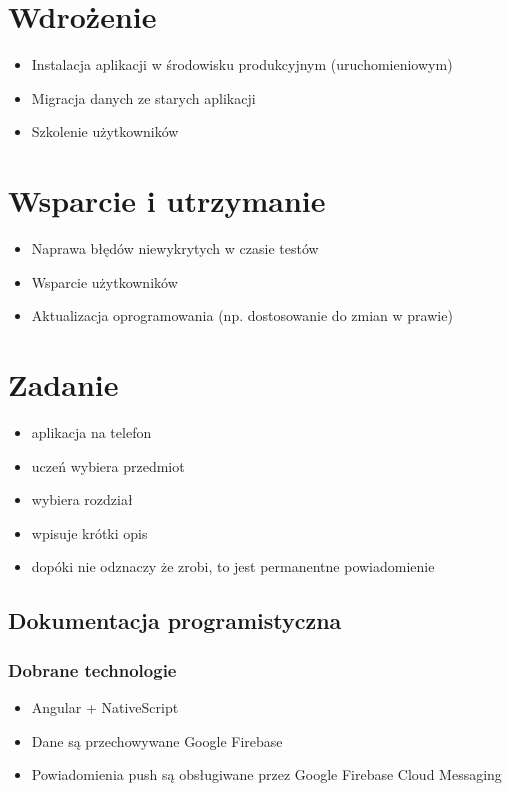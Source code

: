 \documentclass[a4paper]{article}
\begin{document}
\section{Wdrożenie}
\begin{itemize}
    \item Instalacja aplikacji w środowisku produkcyjnym (uruchomieniowym)
    \item Migracja danych ze starych aplikacji
    \item Szkolenie użytkowników
\end{itemize}
\section{Wsparcie i utrzymanie}
\begin{itemize}
    \item Naprawa błędów niewykrytych w czasie testów
    \item Wsparcie użytkowników
    \item Aktualizacja oprogramowania (np. dostosowanie do zmian w prawie)
\end{itemize}
\section{Zadanie}
\begin{itemize}
    \item aplikacja na telefon
    \item uczeń wybiera przedmiot
    \item wybiera rozdział
    \item wpisuje krótki opis
    \item dopóki nie odznaczy że zrobi, to jest permanentne powiadomienie
\end{itemize}
\subsection*{Dokumentacja programistyczna}
\subsubsection*{Dobrane technologie}
\begin{itemize}
    \item Angular + NativeScript
    \item Dane są przechowywane Google Firebase
    \item Powiadomienia push są obsługiwane przez Google Firebase Cloud Messaging
\end{itemize}
\end{document}
